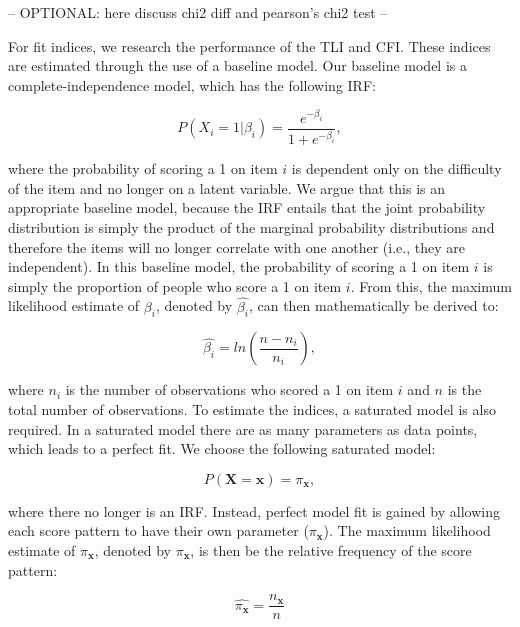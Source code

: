 \documentclass[Royal,sageapa,times,doublespace]{sagej}
\begin{document}
-- OPTIONAL: here discuss chi2 diff and pearson's chi2 test --

\indent For fit indices, we research the performance of the TLI and CFI. These indices are estimated through the use of a baseline model. Our baseline model is a complete-independence model, which has the following IRF:

\begin{equation}
P(X_i = 1 | \beta_{i}) = \frac{e^{- \beta_{i}}}{1 + e^{- \beta_{i}}},
\end{equation}

where the probability of scoring a 1 on item $i$ is dependent only on the difficulty of the item and no longer on a latent variable. We argue that this is an appropriate baseline model, because the IRF entails that the joint probability distribution is simply the product of the marginal probability distributions and therefore the items will no longer correlate with one another (i.e., they are independent). In this baseline model, the probability of scoring a 1 on item $i$ is simply the proportion of people who score a 1 on item $i$. From this, the maximum likelihood estimate of $\beta_{i}$, denoted by $\hat{\beta_{i}}$, can then mathematically be derived to:


\begin{equation*}
\hat{\beta_{i}} = ln(\frac{n - n_i}{n_i}), 
\end{equation*}

where $n_i$ is the number of observations who scored a 1 on item $i$ and $n$ is the total number of observations. To estimate the indices, a saturated model is also required. In a saturated model there are as many parameters as data points, which leads to a perfect fit. We choose the following saturated model:

\begin{equation}
P(\boldsymbol{X} = \boldsymbol{x}) = \pi_{\boldsymbol{x}},
\end{equation}

where there no longer is an IRF. Instead, perfect model fit is gained by allowing each score pattern to have their own parameter ($\pi_{\boldsymbol{x}}$). The maximum likelihood estimate of $\pi_{\boldsymbol{x}}$, denoted by $\hat{\pi_{\boldsymbol{x}}}$, is then be the relative frequency of the score pattern:

\begin{equation*}
\hat{\pi_{\boldsymbol{x}}} = \frac{n_{\boldsymbol{x}}}{n}
\end{equation*}
\end{document}
